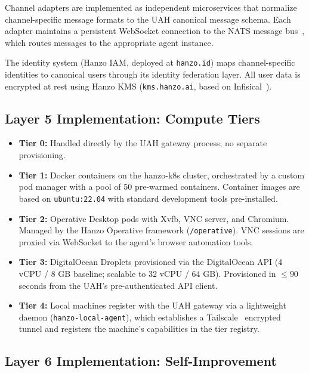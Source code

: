 Channel adapters are implemented as independent microservices that normalize
channel-specific message formats to the UAH canonical message schema. Each
adapter maintains a persistent WebSocket connection to the NATS message
bus~\cite{nats2023}, which routes messages to the appropriate agent
instance.

The identity system (Hanzo IAM, deployed at \texttt{hanzo.id}) maps
channel-specific identities to canonical users through its identity
federation layer. All user data is encrypted at rest using Hanzo KMS
(\texttt{kms.hanzo.ai}, based on Infisical~\cite{infisical2023}).

\subsection{Layer 5 Implementation: Compute Tiers}

\begin{itemize}[leftmargin=1.5em]
    \item \textbf{Tier 0:} Handled directly by the UAH gateway process;
          no separate provisioning.
    \item \textbf{Tier 1:} Docker containers on the hanzo-k8s cluster,
          orchestrated by a custom pod manager with a pool of 50 pre-warmed
          containers. Container images are based on \texttt{ubuntu:22.04}
          with standard development tools pre-installed.
    \item \textbf{Tier 2:} Operative Desktop pods with Xvfb, VNC server,
          and Chromium. Managed by the Hanzo Operative framework
          (\texttt{/operative}). VNC sessions are proxied via WebSocket to
          the agent's browser automation tools.
    \item \textbf{Tier 3:} DigitalOcean Droplets provisioned via the
          DigitalOcean API (4 vCPU / 8 GB baseline; scalable to 32 vCPU /
          64 GB). Provisioned in $\leq 90$ seconds from the UAH's
          pre-authenticated API client.
    \item \textbf{Tier 4:} Local machines register with the UAH gateway
          via a lightweight daemon (\texttt{hanzo-local-agent}), which
          establishes a Tailscale~\cite{tailscale2023} encrypted tunnel
          and registers the machine's capabilities in the tier registry.
\end{itemize}

\subsection{Layer 6 Implementation: Self-Improvement}


